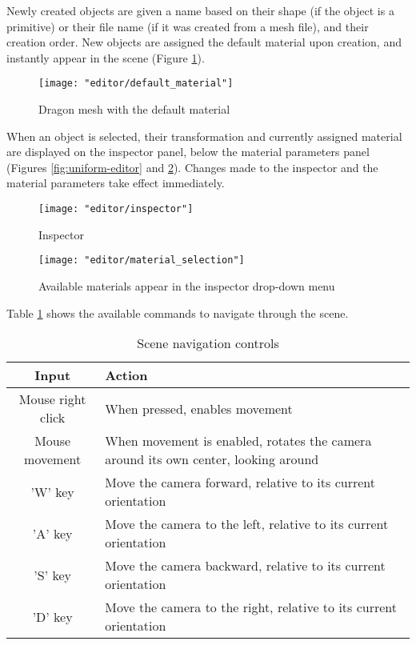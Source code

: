 Newly created objects are given a name based on their shape (if the object is a primitive) or their file name (if it was created from a mesh file), and their creation order. New objects are assigned the default material upon creation, and instantly appear in the scene (Figure \ref{fig:default_material}).

\begin{figure}
    \caption{Dragon mesh with the default material}
    \begin{center}
        \texttt{[image: "editor/default\_material"]}
    \end{center}
    \label{fig:default_material}
\end{figure}

When an object is selected, their transformation and currently assigned material are displayed on the inspector panel, below the material parameters panel (Figures \ref{fig:uniform-editor} and \ref{fig:inspector}). Changes made to the inspector and the material parameters take effect immediately.

\begin{figure}
    \caption{Inspector}
    \begin{center}
        \texttt{[image: "editor/inspector"]}
    \end{center}
    \label{fig:inspector}
\end{figure}

\begin{figure}
    \caption{Available materials appear in the inspector drop-down menu}
    \begin{center}
        \texttt{[image: "editor/material\_selection"]}
    \end{center}
    \label{fig:material_selection}
\end{figure}

Table \ref{tab:navigation_control} shows the available commands to navigate through the scene.

\begin{table}[h]
    \centering
    \caption{Scene navigation controls}
    \begin{tabular}{|c|p{8cm}|}
        \hline
        Input & Action \\
        \hline \hline
        Mouse right click & When pressed, enables movement \\ \hline
        Mouse movement & When movement is enabled, rotates the camera around its own center, looking around \\ \hline
        'W' key & Move the camera forward, relative to its current orientation \\ \hline
        'A' key & Move the camera to the left, relative to its current orientation \\ \hline
        'S' key & Move the camera backward, relative to its current orientation \\ \hline
        'D' key & Move the camera to the right, relative to its current orientation \\
        \hline
    \end{tabular}
    \label{tab:navigation_control}
\end{table}
